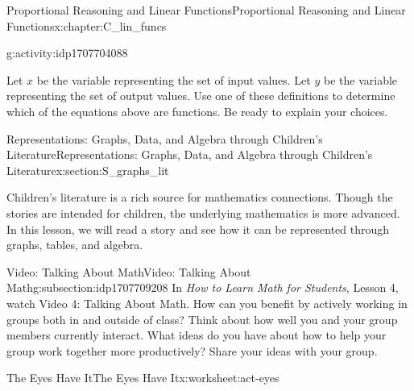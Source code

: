 \documentclass[oneside,10pt,]{book}
\newcommand{\pubtitle}[1]{\textsl{#1}}
\numberwithin{equation}{chapter}
\begin{document}
\begin{chapterptx}{Proportional Reasoning and Linear Functions}{}{Proportional Reasoning and Linear Functions}{}{}{x:chapter:C_lin_funcs}
\begin{introduction}{}
\begin{activity}{}{g:activity:idp1707704088}
\begin{itemize}[label=\textbullet]
\end{itemize}
Let \(x\) be the variable representing the set of input values. Let \(y\) be the variable representing the set of output values. Use one of these definitions to determine which of the equations above are functions. Be ready to explain your choices.%
\end{activity}%
%
%
%
\end{introduction}%
%
%
\typeout{************************************************}
\typeout{************************************************}
%
\begin{sectionptx}{Representations: Graphs, Data, and Algebra through Children's Literature}{}{Representations: Graphs, Data, and Algebra through Children's Literature}{}{}{x:section:S_graphs_lit}
\begin{introduction}{}%
Children's literature is a rich source for mathematics connections. Though the stories are intended for children, the underlying mathematics is more advanced. In this lesson, we will read a story and see how it can be represented through graphs, tables, and algebra.%
\end{introduction}%
%
%
\typeout{************************************************}
\typeout{************************************************}
%
\begin{subsectionptx}{Video: Talking About Math}{}{Video: Talking About Math}{}{}{g:subsection:idp1707709208}
In \pubtitle{How to Learn Math for Students}, Lesson 4, watch Video 4: Talking About Math. How can you benefit by actively working in groups both in and outside of class? Think about how well you and your group members currently interact. What ideas do you have about how to help your group work together more productively? Share your ideas with your group.%
\end{subsectionptx}
%
%
\typeout{************************************************}
\typeout{************************************************}
%
\begin{worksheet-subsection}{The Eyes Have It}{}{The Eyes Have It}{}{}{x:worksheet:act-eyes}

\end{worksheet-subsection}
\end{sectionptx}
\end{chapterptx}
\end{document}
